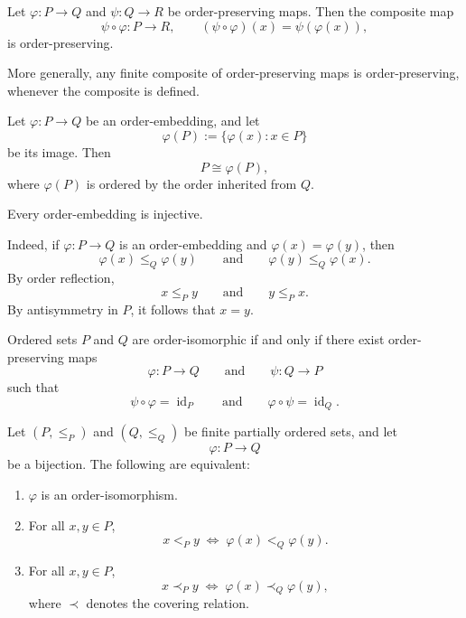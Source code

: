 
\begin{remark}
Let $\varphi : P \to Q$ and $\psi : Q \to R$ be order-preserving maps. Then the composite map
\[
\psi \circ \varphi : P \to R,
\qquad
(\psi \circ \varphi)(x) = \psi(\varphi(x)),
\]
is order-preserving.

More generally, any finite composite of order-preserving maps is order-preserving, whenever the composite is defined.
\end{remark}

\begin{remark}
Let $\varphi : P \to Q$ be an order-embedding, and let
\[
\varphi(P) := \{\varphi(x) : x \in P\}
\]
be its image. Then
\[
P \cong \varphi(P),
\]
where $\varphi(P)$ is ordered by the order inherited from $Q$.
\end{remark}

\begin{remark}
Every order-embedding is injective.

Indeed, if $\varphi : P \to Q$ is an order-embedding and $\varphi(x)=\varphi(y)$, then
\[
\varphi(x) \le_Q \varphi(y)
\qquad\text{and}\qquad
\varphi(y) \le_Q \varphi(x).
\]
By order reflection,
\[
x \le_P y
\qquad\text{and}\qquad
y \le_P x.
\]
By antisymmetry in $P$, it follows that $x=y$.
\end{remark}

\begin{remark}
Ordered sets $P$ and $Q$ are order-isomorphic if and only if there exist order-preserving maps
\[
\varphi : P \to Q
\qquad\text{and}\qquad
\psi : Q \to P
\]
such that
\[
\psi \circ \varphi = \operatorname{id}_P
\qquad\text{and}\qquad
\varphi \circ \psi = \operatorname{id}_Q.
\]
\end{remark}


\begin{lemma}
Let $(P,\le_P)$ and $(Q,\le_Q)$ be finite partially ordered sets, and let
\[
\varphi : P \to Q
\]
be a bijection. The following are equivalent:
\begin{enumerate}
    \item $\varphi$ is an order-isomorphism.

    \item For all $x,y \in P$,
    \[
    x <_P y
    \;\Longleftrightarrow\;
    \varphi(x) <_Q \varphi(y).
    \]

    \item For all $x,y \in P$,
    \[
    x \prec_P y
    \;\Longleftrightarrow\;
    \varphi(x) \prec_Q \varphi(y),
    \]
    where $\prec$ denotes the covering relation.
\end{enumerate}
\end{lemma}

